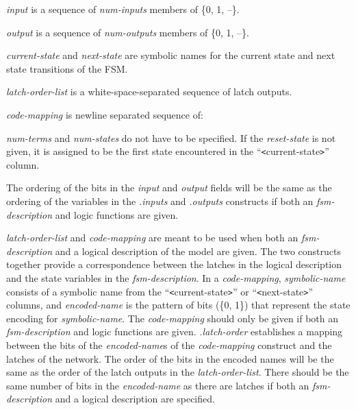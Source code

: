 {\begin{pespace}
\begin{description}
\item {\em input} is a sequence of {\em num-inputs} members of \{0, 1, --\}.

\item {\em output} is a sequence of {\em num-outputs} members of \{0, 1, --\}.

\item {\em current-state} and {\em next-state} are symbolic names for the
current state and next state transitions of the FSM.

\item {\em latch-order-list} is a white-space-separated sequence of latch
outputs.

\item {\em code-mapping} is newline separated sequence of:
\end{description}

{\em num-terms} and {\em num-states} do not have to be specified.  If the
{\em reset-state} is not given, it is assigned to be the first state
encountered in the ``{\verb|<|}current-state{\verb|>|}'' column.

The ordering of the bits in the {\em input} and {\em output} fields will be
the same as the ordering of the variables in the {\em .inputs} and {\em
.outputs} constructs if both an {\em fsm-description} and logic functions
are given. 

{\em latch-order-list} and {\em code-mapping} are meant to be used when both
an {\em fsm-description} and a logical description of the model are given.
The two constructs together provide a correspondence between the latches in
the logical description and the state variables in the {\em
fsm-description}.  In a {\em code-mapping}, {\em symbolic-name} consists of
a symbolic name from the ``{\verb|<|}current-state{\verb|>|}'' or
``{\verb|<|}next-state{\verb|>|}'' columns, and {\em encoded-name} is the
pattern of bits (\{0, 1\}) that represent the state encoding for {\em
symbolic-name}.  The {\em code-mapping} should only be given if both an {\em
fsm-description} and logic functions are given.  {\em .latch-order}
establishes a mapping between the bits of the {\em encoded-name}s of the
{\em code-mapping} construct and the latches of the network.  The order of
the bits in the encoded names will be the same as the order of the latch
outputs in the {\em latch-order-list}.  There should be the same number of
bits in the {\em encoded-name} as there are latches if both an {\em
fsm-description} and a logical description are specified.


\end{pespace}}
